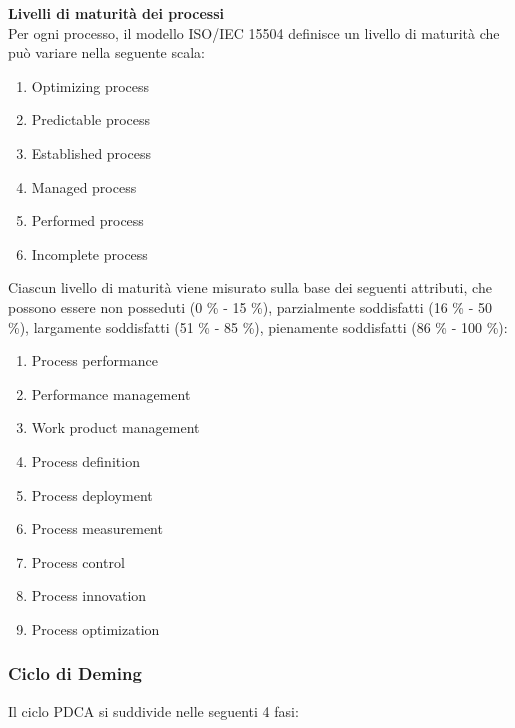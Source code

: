 		\textbf{Livelli di maturità dei processi}\\

		Per ogni processo, il modello ISO/IEC 15504 definisce un livello di maturità che può variare nella seguente scala:
		
		\begin{enumerate}

			\item Optimizing process
			\item Predictable process
			\item Established process
			\item Managed process
			\item Performed process
			\item Incomplete process

		\end{enumerate}
		
		Ciascun livello di maturità viene misurato sulla base dei seguenti attributi, che possono essere non posseduti (0 \% - 15 \%), parzialmente soddisfatti (16 \% - 50 \%), largamente soddisfatti (51 \% - 85 \%), pienamente soddisfatti (86 \% - 100 \%):
		
		\begin{enumerate}
		
			\item Process performance
			\item Performance management
			\item Work product management
			\item Process definition
			\item Process deployment
			\item Process measurement
			\item Process control
			\item Process innovation
			\item Process optimization
			
		\end{enumerate}
		
		\subsubsection{Ciclo di Deming} \label{App:AppendixC}
		
			Il ciclo PDCA si suddivide nelle seguenti 4 fasi:
			
